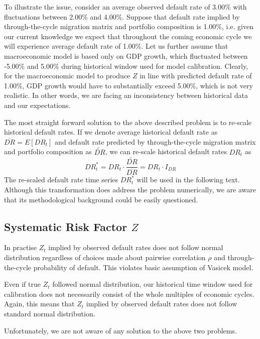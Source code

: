 \documentclass[a4paper]{article}
\begin{document}
To illustrate the issue, consider an average observed default rate of 3.00\% with fluctuations between 2.00\% and 4.00\%. Suppose that default rate implied by through-the-cycle migration matrix and portfolio composition is 1.00\%, i.e. given our current knowledge we expect that throughout the coming economic cycle we will experience average default rate of 1.00\%. Let us further assume that macroeconomic model is based only on GDP growth, which fluctuated between -5.00\% and 5.00\% during historical window used for model calibration. Clearly, for the macroeconomic model to produce $Z$ in line with predicted default rate of 1.00\%, GDP growth would have to substantially exceed 5.00\%, which is not very realistic. In other words, we are facing an inconsistency between historical data and our expectations.

The most straight forward solution to the above described problem is to re-scale historical default rates. If we denote average historical default rate as $\overline{DR} = E[DR_t]$ and default rate predicted by through-the-cycle migration matrix and portfolio composition as $\widetilde{DR}$, we can re-scale historical default rates $DR_t$ as
\begin{equation}
DR^*_t = DR_t \cdot \frac{\widetilde{DR}}{\overline{DR}} = DR_t \cdot I_{DR}
\end{equation}
The re-scaled default rate time series $DR^*_t$ will be used in the following text. Although this transformation does address the problem numerically, we are aware that its methodological background could be easily questioned.

\subsection{Systematic Risk Factor $Z$}

In practise $Z_t$ implied by observed default rates does not follow normal distribution regardless of choices made about pairwise correlation $\rho$ and through-the-cycle probability of default. This violates basic assumption of Vasicek model.

Even if true $Z_t$ followed normal distribution, our historical time window used for calibration does not necessarily consist of the whole multiples of economic cycles. Again, this means that $Z_t$ implied by observed default rates does not follow standard normal distribution.

Unfortunately, we are not aware of any solution to the above two problems.
\end{document}
